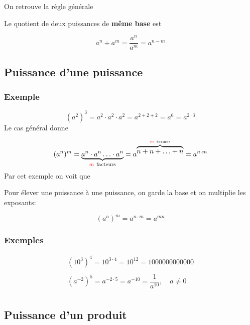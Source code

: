 \documentclass[
  12pt,
]{book}
\begin{document}
On retrouve la règle générale

\begin{reglebox}
Le quotient de deux puissances de \textbf{même base} est

\[a^n \div a^m = \dfrac{a^n}{a^m} = a^{n-m}\]

\end{reglebox}

\hypertarget{puissance-dune-puissance}{%
\subsection{Puissance d'une puissance}\label{puissance-dune-puissance}}

\hypertarget{exemple-1}{%
\subsubsection{Exemple}\label{exemple-1}}

\[(a^2)^3 = a^2\cdot a^2\cdot a^2 = a^{2+2+2}=a^6=a^{2\cdot 3}\]
Le cas général donne

\[(a^n)^m = \underbrace{a^n\cdot a^n\ldots \cdot a^n}_{{\color{red}m}~\text{facteurs}} = a^{\overbrace{n+n+\ldots+n}^{{\color{red}m}~\text{termes}}}=a^{n\cdot m}\]
Par cet exemple on voit que

\begin{reglebox}
Pour élever une puissance à une puissance, on garde la base et on multiplie les exposants:

\[(a^n)^m = a^{n\cdot m}= a^{mn}\]

\end{reglebox}

\hypertarget{exemples-3}{%
\subsubsection{Exemples}\label{exemples-3}}

\begin{align*}
(10^3)^4 = 10^{3\cdot 4}= 10^{12} = 1000 000 000 000\\
\\
(a^{-2})^5 = a^{-2\cdot 5}= a^{-10} = \dfrac{1}{a^{10}}, \quad a\neq 0\\
\end{align*}

\hypertarget{puissance-dun-produit}{%
\subsection{Puissance d'un produit}\label{puissance-dun-produit}}
\end{document}
